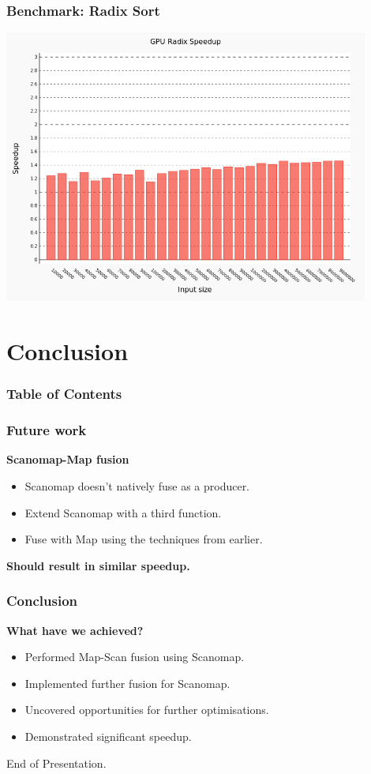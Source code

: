 \documentclass{beamer}
\begin{document}
\begin{frame}
 \frametitle{Benchmark: Radix Sort}
    \includegraphics[width=0.9\textwidth]{../images/radix-comparing.png}
\end{frame}

\section[con]{Conclusion}
\begin{frame}
\frametitle{Table of Contents}
\tableofcontents[currentsection]
\end{frame}

\begin{frame}
 \frametitle{Future work}
\large \textbf{Scanomap-Map fusion}
\begin{itemize}
\item Scanomap doesn't natively fuse as a producer.
\item Extend Scanomap with a third function.
\item Fuse with Map using the techniques from earlier.
\end{itemize}
\large \textbf{Should result in similar speedup.}
\end{frame}
\begin{frame}
 \frametitle{Conclusion}
\large \textbf{What have we achieved?}
 \begin{itemize}
 \item Performed Map-Scan fusion using Scanomap.
 \item Implemented further fusion for Scanomap.
 \item Uncovered opportunities for further optimisations.
 \item Demonstrated significant speedup.
 \end{itemize}
\end{frame}
\begin{frame}
\Large End of Presentation.
\end{frame}
\end{document}
